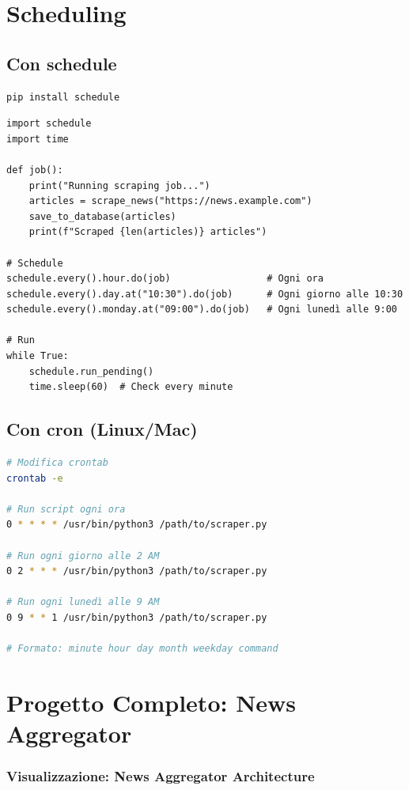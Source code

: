 \section{Scheduling}

\subsection{Con schedule}

\begin{lstlisting}[language=bash]
pip install schedule
\end{lstlisting}

\begin{lstlisting}
import schedule
import time

def job():
    print("Running scraping job...")
    articles = scrape_news("https://news.example.com")
    save_to_database(articles)
    print(f"Scraped {len(articles)} articles")

# Schedule
schedule.every().hour.do(job)                 # Ogni ora
schedule.every().day.at("10:30").do(job)      # Ogni giorno alle 10:30
schedule.every().monday.at("09:00").do(job)   # Ogni lunedì alle 9:00

# Run
while True:
    schedule.run_pending()
    time.sleep(60)  # Check every minute
\end{lstlisting}

\subsection{Con cron (Linux/Mac)}

\begin{lstlisting}[language=bash]
# Modifica crontab
crontab -e

# Run script ogni ora
0 * * * * /usr/bin/python3 /path/to/scraper.py

# Run ogni giorno alle 2 AM
0 2 * * * /usr/bin/python3 /path/to/scraper.py

# Run ogni lunedì alle 9 AM
0 9 * * 1 /usr/bin/python3 /path/to/scraper.py

# Formato: minute hour day month weekday command
\end{lstlisting}

\section{Progetto Completo: News Aggregator}

\subsubsection{Visualizzazione: News Aggregator Architecture}


